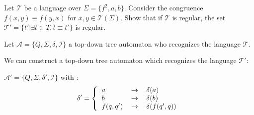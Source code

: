 \documentclass{article}
\theoremstyle{plain}
\begin{document}
  \exercice Let $\mathcal T$ be a language over $\Sigma =\{f^2, a, b\}$.
  Consider the congruence $f(x, y) \equiv f(y, x)$ for $x, y \in \mathcal
  T(\Sigma)$. Show that if $\mathcal T$ is regular, the set
  $\mathcal T' = \{t' | \exists t \in T, t \equiv t'\}$ is regular.

  \begin{correction}{}{}
    Let $\mathcal A = \{Q, \Sigma, \delta, \mathcal I\}$ a top-down tree
    automaton who recognizes the language $\mathcal T$.

    We can construct a top-down tree automaton which recognizes the language
    $\mathcal T'$:

    \vspace{5mm}

    $\mathcal A' = \{Q, \Sigma, \delta', \mathcal I\}$ with :
    \[
      \delta' = \left \{
        \begin{tabular}{l l l}
          $a$ & $\to$ & $\delta(a)$ \\
          $b$ & $\to$ & $\delta(b)$ \\
          $f(q, q')$ & $\to$ & $\delta(f(q', q))$ \\
        \end{tabular}
        \right.
    \]
  \end{correction}
 
\end{document}
